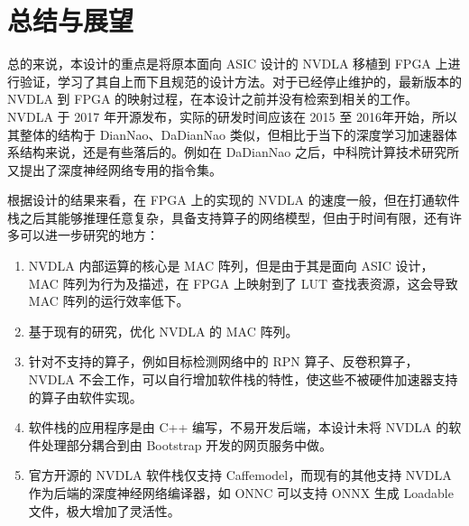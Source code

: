 \chapter{总结与展望}\label{chap:conclusion}

总的来说，本设计的重点是将原本面向 ASIC 设计的 NVDLA 移植到 FPGA 上进行验证，学习了其自上而下且规范的设计方法。对于已经停止维护的，最新版本的 NVDLA 到 FPGA 的映射过程，在本设计之前并没有检索到相关的工作。NVDLA 于 2017 年开源发布，实际的研发时间应该在 2015 至 2016年开始，所以其整体的结构于 DianNao、DaDianNao 类似，但相比于当下的深度学习加速器体系结构来说，还是有些落后的。例如在 DaDianNao 之后，中科院计算技术研究所又提出了深度神经网络专用的指令集。

根据设计的结果来看，在 FPGA 上的实现的 NVDLA 的速度一般，但在打通软件栈之后其能够推理任意复杂，具备支持算子的网络模型，但由于时间有限，还有许多可以进一步研究的地方：

\begin{enumerate}
    \item NVDLA 内部运算的核心是 MAC 阵列，但是由于其是面向 ASIC 设计，MAC 阵列为行为及描述，在 FPGA 上映射到了 LUT 查找表资源，这会导致 MAC 阵列的运行效率低下。
    \item 基于现有的研究\cite{祁琛2018应用于神经网络的高效能计算单元的研究与实现}，优化 NVDLA 的 MAC 阵列。
    \item 针对不支持的算子，例如目标检测网络中的 RPN 算子、反卷积算子，NVDLA 不会工作，可以自行增加软件栈的特性，使这些不被硬件加速器支持的算子由软件实现。
    \item 软件栈的应用程序是由 C++ 编写，不易开发后端，本设计未将 NVDLA 的软件处理部分耦合到由 Bootstrap 开发的网页服务中做。
    \item 官方开源的 NVDLA 软件栈仅支持 Caffemodel，而现有的其他支持 NVDLA 作为后端的深度神经网络编译器，如 ONNC 可以支持 ONNX 生成 Loadable 文件，极大增加了灵活性。
\end{enumerate}